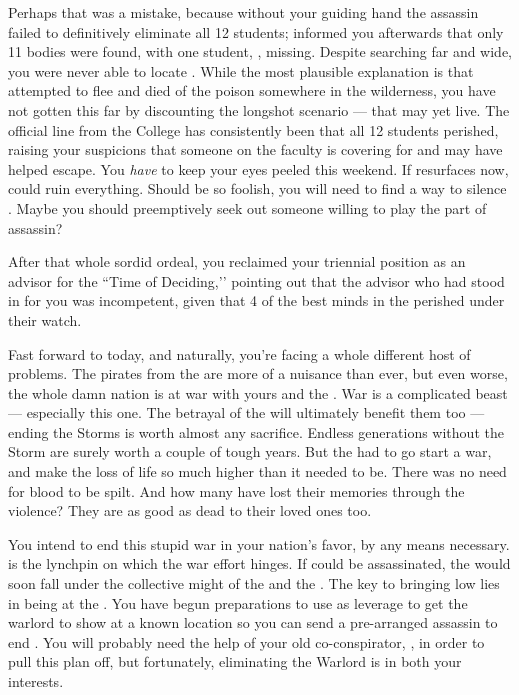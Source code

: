 \documentclass[char]{GL2020}
\begin{document}
Perhaps that was a mistake, because without your guiding hand the assassin failed to definitively eliminate all 12 students; \cDiplomat{} informed you afterwards that only 11 bodies were found, with one student, \cKidScientist{\full}, missing. Despite searching far and wide, you were never able to locate \cKidScientist{\them}. While the most plausible explanation is that \cKidScientist{\they} attempted to flee and died of the poison somewhere in the wilderness, you have not gotten this far by discounting the longshot scenario — that \cKidScientist{} may yet live. The official line from the College has consistently been that all 12 students perished, raising your suspicions that someone on the faculty is covering for \cKidScientist{} and may have helped \cKidScientist{\them} escape. You \emph{have} to keep your eyes peeled this weekend. If \cKidScientist{} resurfaces now, \cKidScientist{\they} could ruin everything. Should \cKidScientist{\they} be so foolish, you will need to find a way to silence \cKidScientist{\them}. Maybe you should preemptively seek out someone willing to play the part of assassin? 

After that whole sordid ordeal, you reclaimed your triennial position as an advisor for the ``Time of Deciding,’’ pointing out that the advisor who had stood in for you was incompetent, given that 4 of the best minds in the \pFarm{} perished under their watch.

Fast forward to today, and naturally, you’re facing a whole different host of problems. The pirates from the \pShip{} are more of a nuisance than ever, but even worse, the whole damn nation is at war with yours and the \pTech{}. War is a complicated beast — especially this one. The betrayal of the \pShip{} will ultimately benefit them too — ending the Storms is worth almost any sacrifice. Endless generations without the Storm are surely worth a couple of tough years. But the \pShip{} had to go start a war, and make the loss of life so much higher than it needed to be. There was no need for \pFarm{} blood to be spilt. And how many \pShippies{} have lost their memories through the violence? They are as good as dead to their loved ones too. 

You intend to end this stupid war in your nation's favor, by any means necessary. \cLoud{\full} is the lynchpin on which the \pShip{} war effort hinges. If \cLoud{\they} could be assassinated, the \pShip{} would soon fall under the collective might of the \pFarm{} and the \pTech{}. The key to bringing \cLoud{} low lies in \cLoud{\their} \cWarlordDaughter{\offspring} being at the \pSchool{}. You have begun preparations to use \cWarlordDaughter{\them} as leverage to get the warlord to show \cLoud{\themself} at a known location so you can send a pre-arranged assassin to end \cLoud{\them}. You will probably need the help of your old co-conspirator, \cDiplomat{}, in order to pull this plan off, but fortunately, eliminating the Warlord is in both your interests.
\end{document}
